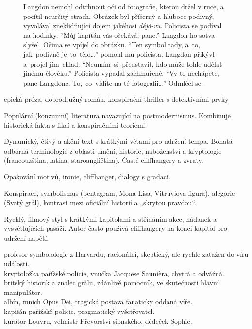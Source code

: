 \documentclass[FGBook.tex]{subfiles}
\begin{document}

\noindent\begin{figure}\footnotesize
{}
\setlength{\parindent}{3pt}
Langdon nemohl odtrhnout oči od fotografie, kterou držel v ruce, a pocítil neurčitý strach.
Obrázek byl příšerný a hluboce podivný, vyvolával zneklidňující dojem jakéhosi \textit{déjá-vu}.
Policista se podíval na hodinky.
\enquote{Můj kapitán vás očekává, pane.}
Langdon ho sotva slyšel.
Očima se vpíjel do obrázku.
\enquote{Ten symbol tady, a~to, jak~podivně je~to~tělo…}  pomohl mu policista.
Langdon přikývl a~projel jím~chlad.
\enquote{Neumím~si~představit, kdo může tohle udělat jinému člověku.}
Policista vypadal zachmuřeně.
\enquote{Vy to nechápete, pane Langdone. To,~co~vidíte na té fotografii…} Odmlčel se.
\end{figure}


\noindent epická próza, dobrodružný román, konspirační thriller s detektivními prvky

\noindent Populární (konzumní) literatura navazující na postmodernismus. Kombinuje historická fakta s fikcí a konspiračními teoriemi.

\noindent Dynamický, čtivý a akční text s krátkými větami pro udržení tempa. Bohatá odborná terminologie z oblasti umění, historie, náboženství a kryptologie (francouzština, latina, staroangličtina). Časté cliffhangery a zvraty.

\noindent Opakování motivů, ironie, cliffhanger, dialogy s gradací.

\noindent Konspirace, symbolismus (pentagram, Mona Lisa, Vitruviova figura), alegorie (Svatý grál), kontrast mezi oficiální historií a „skrytou pravdou“.

\noindent Rychlý, filmový styl s krátkými kapitolami a střídáním akce, hádanek a vysvětlujících pasáží. Autor často používá cliffhangery na konci kapitol pro udržení napětí.

\noindent 
{} profesor symbolologie z Harvardu, racionální, skeptický, ale rychle zatažen do víru událostí.\\
 kryptoložka pařížské policie, vnučka Jacquese Saunièra, chytrá a odvážná.\\
 britský historik a znalec grálu, zdánlivě pomocník, ve skutečnosti hlavní manipulátor.\\
 albín, mnich Opus Dei, tragická postava fanaticky oddaná víře.\\
 kapitán pařížské policie, pragmatický vyšetřovatel.\\
 kurátor Louvru, velmistr Převorství sionského, dědeček Sophie.
\end{document}
